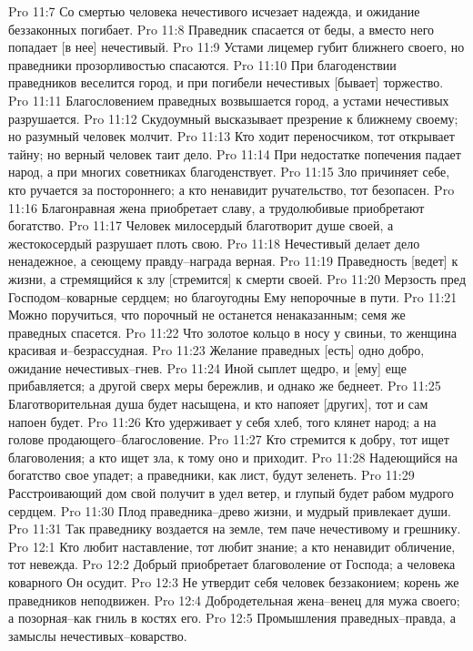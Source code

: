 Pro 11:7  Со смертью человека нечестивого исчезает надежда, и ожидание беззаконных погибает.
Pro 11:8  Праведник спасается от беды, а вместо него попадает [в нее] нечестивый.
Pro 11:9  Устами лицемер губит ближнего своего, но праведники прозорливостью спасаются.
Pro 11:10  При благоденствии праведников веселится город, и при погибели нечестивых [бывает] торжество.
Pro 11:11  Благословением праведных возвышается город, а устами нечестивых разрушается.
Pro 11:12  Скудоумный высказывает презрение к ближнему своему; но разумный человек молчит.
Pro 11:13  Кто ходит переносчиком, тот открывает тайну; но верный человек таит дело.
Pro 11:14  При недостатке попечения падает народ, а при многих советниках благоденствует.
Pro 11:15  Зло причиняет себе, кто ручается за постороннего; а кто ненавидит ручательство, тот безопасен.
Pro 11:16  Благонравная жена приобретает славу, а трудолюбивые приобретают богатство.
Pro 11:17  Человек милосердый благотворит душе своей, а жестокосердый разрушает плоть свою.
Pro 11:18  Нечестивый делает дело ненадежное, а сеющему правду--награда верная.
Pro 11:19  Праведность [ведет] к жизни, а стремящийся к злу [стремится] к смерти своей.
Pro 11:20  Мерзость пред Господом--коварные сердцем; но благоугодны Ему непорочные в пути.
Pro 11:21  Можно поручиться, что порочный не останется ненаказанным; семя же праведных спасется.
Pro 11:22  Что золотое кольцо в носу у свиньи, то женщина красивая и--безрассудная.
Pro 11:23  Желание праведных [есть] одно добро, ожидание нечестивых--гнев.
Pro 11:24  Иной сыплет щедро, и [ему] еще прибавляется; а другой сверх меры бережлив, и однако же беднеет.
Pro 11:25  Благотворительная душа будет насыщена, и кто напояет [других], тот и сам напоен будет.
Pro 11:26  Кто удерживает у себя хлеб, того клянет народ; а на голове продающего--благословение.
Pro 11:27  Кто стремится к добру, тот ищет благоволения; а кто ищет зла, к тому оно и приходит.
Pro 11:28  Надеющийся на богатство свое упадет; а праведники, как лист, будут зеленеть.
Pro 11:29  Расстроивающий дом свой получит в удел ветер, и глупый будет рабом мудрого сердцем.
Pro 11:30  Плод праведника--древо жизни, и мудрый привлекает души.
Pro 11:31  Так праведнику воздается на земле, тем паче нечестивому и грешнику.
Pro 12:1  Кто любит наставление, тот любит знание; а кто ненавидит обличение, тот невежда.
Pro 12:2  Добрый приобретает благоволение от Господа; а человека коварного Он осудит.
Pro 12:3  Не утвердит себя человек беззаконием; корень же праведников неподвижен.
Pro 12:4  Добродетельная жена--венец для мужа своего; а позорная--как гниль в костях его.
Pro 12:5  Промышления праведных--правда, а замыслы нечестивых--коварство.
